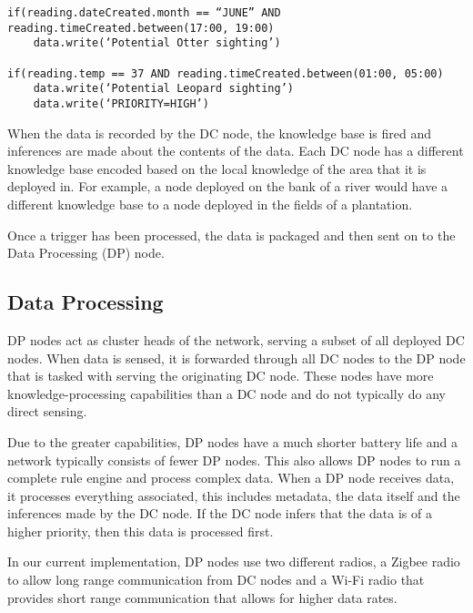 \begin{lstlisting}[breaklines=true, caption=Example DC Node Rules]
if(reading.dateCreated.month == “JUNE” AND reading.timeCreated.between(17:00, 19:00)
	data.write(‘Potential Otter sighting’)

if(reading.temp == 37 AND reading.timeCreated.between(01:00, 05:00)
	data.write(‘Potential Leopard sighting’)
	data.write(‘PRIORITY=HIGH’)
\end{lstlisting}

When the data is recorded by the DC node, the knowledge base is fired and inferences are made about the contents of the data. Each DC node has a different knowledge base encoded based on the local knowledge of the area that it is deployed in.  For example, a node deployed on the bank of a river would have a different knowledge base to a node deployed in the fields of a plantation.

Once a trigger has been processed, the data is packaged and then sent on to the Data Processing (DP) node.

	\subsection{Data Processing}
	DP nodes act as cluster heads of the network, serving a subset of all deployed DC nodes. When data is sensed, it is forwarded through all DC nodes to the DP node that is tasked with serving the originating DC node. These nodes have more knowledge-processing capabilities than a DC node and do not typically do any direct sensing. 

	Due to the greater capabilities, DP nodes have a much shorter battery life and a network typically consists of fewer DP nodes. This also allows DP nodes to run a complete rule engine and process complex data. When a DP node receives data, it processes everything associated, this includes metadata, the data itself and the inferences made by the DC node. If the DC node infers that the data is of a higher priority, then this data is processed first.

	In our current implementation, DP nodes use two different radios, a Zigbee radio to allow long range communication from DC nodes and a Wi-Fi radio that provides short range communication that allows for higher data rates.

